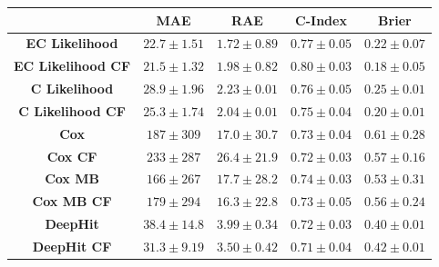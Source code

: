 \begin{table}
            \resizebox*{1.0\linewidth}{0.1\textheight}
            {
                \begin{tabular}{||c|cc|c|c||}
                    \hline
                                                & \textbf{\gls{MAE}} & \textbf{\gls{RAE}} & \textbf{C-Index}  & \textbf{Brier}    \\
                    \hline
                    \textbf{EC Likelihood}      & $22.7\pm1.51$      & $1.72\pm0.89$      & $0.77\pm0.05$     & $0.22\pm0.07$      \\
                    \textbf{EC Likelihood CF}   & $21.5\pm1.32$      & $1.98\pm0.82$      & $0.80\pm0.03$     & $0.18\pm0.05$      \\
                    \textbf{C Likelihood}       & $28.9\pm1.96$      & $2.23\pm0.01$      & $0.76\pm0.05$     & $0.25\pm0.01$      \\
                    \textbf{C Likelihood CF}    & $25.3\pm1.74$      & $2.04\pm0.01$      & $0.75\pm0.04$     & $0.20\pm0.01$      \\
                    \hline
                    \textbf{Cox}                & $187 \pm309 $      & $17.0\pm30.7$      & $0.73\pm0.04$     & $0.61\pm0.28$      \\
                    \textbf{Cox CF}             & $233 \pm287 $      & $26.4\pm21.9$      & $0.72\pm0.03$     & $0.57\pm0.16$      \\
                    \textbf{Cox \gls{MB}}       & $166 \pm267 $      & $17.7\pm28.2$      & $0.74\pm0.03$     & $0.53\pm0.31$      \\
                    \textbf{Cox \gls{MB} CF}    & $179 \pm294 $      & $16.3\pm22.8$      & $0.73\pm0.05$     & $0.56\pm0.24$      \\
                    \hline
                    \textbf{DeepHit}            & $38.4\pm14.8$      & $3.99\pm0.34$      & $0.72\pm0.03$     & $0.40\pm0.01$      \\
                    \textbf{DeepHit CF}         & $31.3\pm9.19$      & $3.50\pm0.42$      & $0.71\pm0.04$     & $0.42\pm0.01$      \\
                    \hline
                \end{tabular}
            }
            \label{tab:deep_learning_for_ct_based_survival_analysis_of_idiopathic_pulmonary_fibrosis_patients_appendix_results_table}
        \end{table}
    
